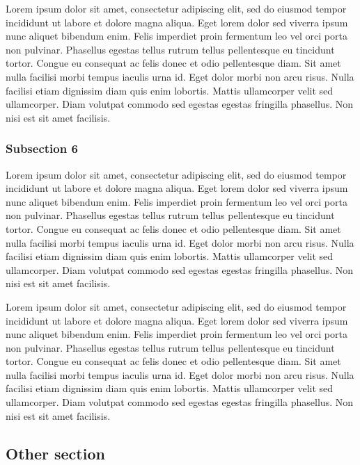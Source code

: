 \documentclass[
]{article}
\begin{document}
Lorem ipsum dolor sit amet, consectetur adipiscing elit, sed do eiusmod
tempor incididunt ut labore et dolore magna aliqua. Eget lorem dolor sed
viverra ipsum nunc aliquet bibendum enim. Felis imperdiet proin
fermentum leo vel orci porta non pulvinar. Phasellus egestas tellus
rutrum tellus pellentesque eu tincidunt tortor. Congue eu consequat ac
felis donec et odio pellentesque diam. Sit amet nulla facilisi morbi
tempus iaculis urna id. Eget dolor morbi non arcu risus. Nulla facilisi
etiam dignissim diam quis enim lobortis. Mattis ullamcorper velit sed
ullamcorper. Diam volutpat commodo sed egestas egestas fringilla
phasellus. Non nisi est sit amet facilisis.

\subsubsection{Subsection 6}\label{subsection-6}

Lorem ipsum dolor sit amet, consectetur adipiscing elit, sed do eiusmod
tempor incididunt ut labore et dolore magna aliqua. Eget lorem dolor sed
viverra ipsum nunc aliquet bibendum enim. Felis imperdiet proin
fermentum leo vel orci porta non pulvinar. Phasellus egestas tellus
rutrum tellus pellentesque eu tincidunt tortor. Congue eu consequat ac
felis donec et odio pellentesque diam. Sit amet nulla facilisi morbi
tempus iaculis urna id. Eget dolor morbi non arcu risus. Nulla facilisi
etiam dignissim diam quis enim lobortis. Mattis ullamcorper velit sed
ullamcorper. Diam volutpat commodo sed egestas egestas fringilla
phasellus. Non nisi est sit amet facilisis.

Lorem ipsum dolor sit amet, consectetur adipiscing elit, sed do eiusmod
tempor incididunt ut labore et dolore magna aliqua. Eget lorem dolor sed
viverra ipsum nunc aliquet bibendum enim. Felis imperdiet proin
fermentum leo vel orci porta non pulvinar. Phasellus egestas tellus
rutrum tellus pellentesque eu tincidunt tortor. Congue eu consequat ac
felis donec et odio pellentesque diam. Sit amet nulla facilisi morbi
tempus iaculis urna id. Eget dolor morbi non arcu risus. Nulla facilisi
etiam dignissim diam quis enim lobortis. Mattis ullamcorper velit sed
ullamcorper. Diam volutpat commodo sed egestas egestas fringilla
phasellus. Non nisi est sit amet facilisis.

\subsection{Other section}\label{other-section}
\end{document}
